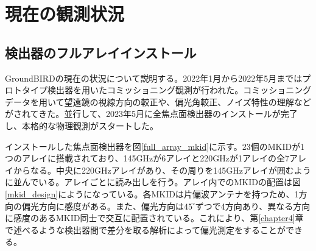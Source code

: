 \section{現在の観測状況}

\subsection{検出器のフルアレイインストール}
\label{full_array}
GroundBIRDの現在の状況について説明する。2022年1月から2022年5月まではプロトタイプ検出器を用いたコミッショニング観測が行われた。コミッショニングデータを用いて望遠鏡の視線方向の較正\cite{sueno_paper}や、偏光角較正、ノイズ特性の理解\cite{sueno_doctor}などがされてきた。並行して、2023年5月に全焦点面検出器のインストールが完了し、本格的な物理観測がスタートした。

インストールした焦点面検出器を図\ref{full_array_mkid}に示す。23個のMKIDが1つのアレイに搭載されており、145GHzが6アレイと220GHzが1アレイの全7アレイからなる。中央に220GHzアレイがあり、その周りを145GHzアレイが囲むように並んでいる。アレイごとに読み出しを行う。アレイ内でのMKIDの配置は図\ref{mkid_design}にようになっている。各MKIDは片偏波アンテナを持つため、1方向の偏光方向に感度がある。また、偏光方向は$45^{\circ}$ずつで4方向あり、異なる方向に感度のあるMKID同士で交互に配置されている。これにより、第\ref{chapter4}章で述べるような検出器間で差分を取る解析によって偏光測定をすることができる。


